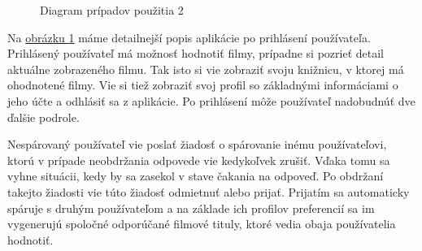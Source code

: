 \begin{figure}[hbt!]
  \centering  
  \def\stackalignment{c}
           {\scriptsize}
	\caption{Diagram prípadov použitia 2}
  \label{usecase2}
\end{figure}
Na \hyperref[usecase2]{obrázku \ref{usecase2}} máme detailnejší popis aplikácie po prihlásení používateľa. Prihlásený používateľ má možnosť hodnotiť filmy, prípadne si pozrieť detail aktuálne zobrazeného filmu. Tak isto si vie zobraziť svoju knižnicu, v ktorej má ohodnotené filmy. Vie si tiež zobraziť svoj profil so základnými informáciami o jeho účte a odhlásiť sa z aplikácie. Po prihlásení môže používateľ nadobudnúť dve ďalšie podrole. 

Nespárovaný používateľ vie poslať žiadosť o spárovanie inému používateľovi, ktorú v prípade neobdržania odpovede vie kedykoľvek zrušiť. Vďaka tomu sa vyhne situácii, kedy by sa zasekol v stave čakania na odpoveď. Po obdržaní takejto žiadosti vie túto žiadosť odmietnuť alebo prijať. Prijatím sa automaticky spáruje s druhým používateľom a na základe ich profilov preferencií sa im vygenerujú spoločné odporúčané filmové tituly, ktoré vedia obaja používatelia hodnotiť. 

